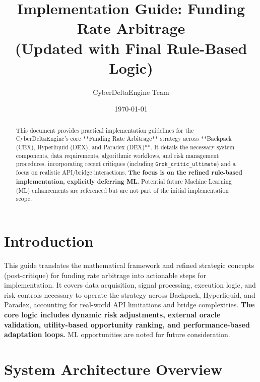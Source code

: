 \documentclass{article}
\title{Implementation Guide: Funding Rate Arbitrage \\ \Large{(Updated with Final Rule-Based Logic)}}
\author{CyberDeltaEngine Team}
\date{\today}
\begin{document}
\maketitle

\begin{abstract}
This document provides practical implementation guidelines for the CyberDeltaEngine's core **Funding Rate Arbitrage** strategy across **Backpack (CEX), Hyperliquid (DEX), and Paradex (DEX)**. It details the necessary system components, data requirements, algorithmic workflows, and risk management procedures, incorporating recent critiques (including \texttt{Grok\_critic\_ultimate}) and a focus on realistic API/bridge interactions. \textbf{The focus is on the refined rule-based implementation, explicitly deferring ML.} Potential future Machine Learning (ML) enhancements are referenced but are not part of the initial implementation scope.
\end{abstract}

\section{Introduction}
This guide translates the mathematical framework and refined strategic concepts (post-critique) for funding rate arbitrage into actionable steps for implementation. It covers data acquisition, signal processing, execution logic, and risk controls necessary to operate the strategy across Backpack, Hyperliquid, and Paradex, accounting for real-world API limitations and bridge complexities. \textbf{The core logic includes dynamic risk adjustments, external oracle validation, utility-based opportunity ranking, and performance-based adaptation loops.} ML opportunities are noted for future consideration.

\section{System Architecture Overview}
\end{document}
